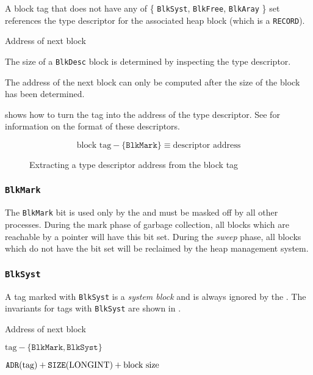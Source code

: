 A block tag that does not have any of \{ \texttt{BlkSyst},
\texttt{BlkFree}, \texttt{BlkAray} \} set references the type
descriptor for the associated heap block (which is a \texttt{RECORD}).

\begin{Ventry}{Address of next block}
\item[Size of block]
  The size of a \texttt{BlkDesc} block is determined by inspecting the type
  descriptor.

\item[Address of next block] The address of the next block can only
  be computed after the size of the block has been determined.
\end{Ventry}


 shows how to turn the tag into the
address of the type descriptor. See  for
information on the format of these descriptors.


\begin{figure}[h]
$$\textrm{block tag} - \lbrace \texttt{BlkMark} \rbrace \equiv \textrm{descriptor address}$$
  \caption{Extracting a type descriptor address from the block tag}
  \label{memlay:blkdesc-extract}
\end{figure}

\subsubsection{\texttt{BlkMark}}\label{memlay:descriptors-kind-blkmark}

The \texttt{BlkMark} bit is used only by the \gc and must be masked
off by all other processes.  During the mark phase of garbage
collection, all blocks which are reachable by a pointer will have this
bit set.  During the \emph{sweep} phase, all blocks which do not have
the bit set will be reclaimed by the heap management system.

\subsubsection{\texttt{BlkSyst}}\label{memlay:descriptors-kind-blksyst}

A tag marked with \texttt{BlkSyst} is a \emph{system block} and is
always ignored by the \gc.  The invariants for tags with
\texttt{BlkSyst} are shown in .

\begin{Ventry}{Address of next block}
\item[Size of block]      $\textrm{tag} - \lbrace\texttt{BlkMark}, \texttt{BlkSyst}\rbrace$
\item[Address of next block]     $\texttt{ADR}(\textrm{tag}) + \texttt{SIZE}(\textrm{LONGINT}) + \textrm{block size}$
\end{Ventry}

